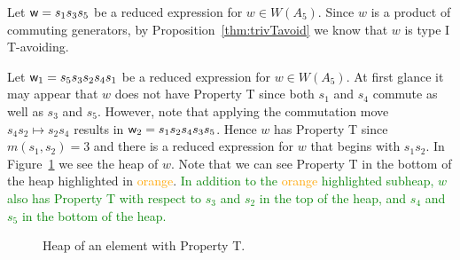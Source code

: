 \begin{example}\label{ex:tavoid}
Let $\mathsf{w}=s_1s_3s_5$ be a reduced expression for $w \in W(A_5)$.  Since $w$ is a product of commuting generators, by Proposition~\ref{thm:trivTavoid} we know that $w$ is type I T-avoiding. %
\end{example}
\begin{example}\label{ex:prop-T}
Let $\mathsf{w}_1=s_5s_3s_2s_4s_1$ be a reduced expression for $w \in W(A_5)$. At first glance it may appear that $w$ does not have Property T since both $s_1$ and $s_4$ commute as well as $s_3$ and $s_5$. However, note that applying the commutation move $s_4s_2 \mapsto s_2s_4$ results in $\mathsf{w}_2=s_1s_2s_4s_3s_5$. Hence $w$ has Property T since $m(s_1,s_2)=3$ and there is a reduced expression for $w$ that begins with $s_1s_2$. In Figure~\ref{fig:heapw/T} we see the heap of $w$. Note that we can see Property T in the bottom of the heap highlighted in \textcolor{orange}{orange}. \textcolor{green}{In addition to the \textcolor{orange}{orange} highlighted subheap, $w$ also has Property T with respect to $s_3$ and $s_2$ in the top of the heap, and $s_4$ and $s_5$ in the bottom of the heap.}
\end{example}

\begin{figure}[h!]\centering
{}
\caption{Heap of an element with Property T.} \label{fig:heapw/T}	
\end{figure}

